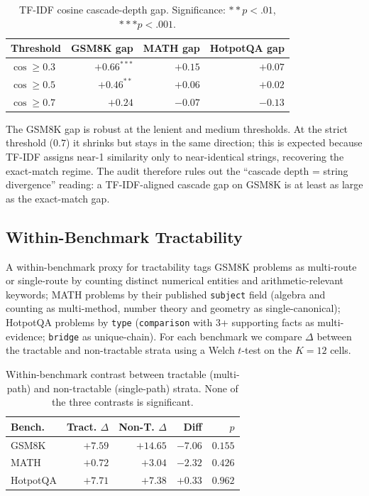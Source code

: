 \documentclass[11pt]{article}
\begin{document}
\begin{table}[t]
  \centering
  \small
  \begin{tabular}{@{}lrrr@{}}
    \toprule
    Threshold & GSM8K gap & MATH gap & HotpotQA gap \\
    \midrule
    $\cos \geq 0.3$ & $\mathbf{+0.66}^{***}$ & $+0.15$ & $+0.07$ \\
    $\cos \geq 0.5$ & $+0.46^{**}$ & $+0.06$ & $+0.02$ \\
    $\cos \geq 0.7$ & $+0.24$ & $-0.07$ & $-0.13$ \\
    \bottomrule
  \end{tabular}
  \caption{TF-IDF cosine cascade-depth gap. Significance: $**p<.01$, $***p<.001$.}
  \label{tab:tfidf}
\end{table}

The GSM8K gap is robust at the lenient and medium thresholds. At the strict threshold ($0.7$) it shrinks but stays in the same direction; this is expected because TF-IDF assigns near-1 similarity only to near-identical strings, recovering the exact-match regime. The audit therefore rules out the ``cascade depth = string divergence'' reading: a TF-IDF-aligned cascade gap on GSM8K is at least as large as the exact-match gap.

\subsection{Within-Benchmark Tractability}
\label{sec:within}

A within-benchmark proxy for tractability tags GSM8K problems as multi-route or single-route by counting distinct numerical entities and arithmetic-relevant keywords; MATH problems by their published \texttt{subject} field (algebra and counting as multi-method, number theory and geometry as single-canonical); HotpotQA problems by \texttt{type} (\texttt{comparison} with 3+ supporting facts as multi-evidence; \texttt{bridge} as unique-chain). For each benchmark we compare $\Delta$ between the tractable and non-tractable strata using a Welch $t$-test on the $K=12$ cells.

\begin{table}[t]
  \centering
  \small
  \begin{tabular}{@{}lrrrr@{}}
    \toprule
    Bench. & Tract. $\Delta$ & Non-T. $\Delta$ & Diff & $p$ \\
    \midrule
    GSM8K & $+7.59$ & $+14.65$ & $-7.06$ & $0.155$ \\
    MATH & $+0.72$ & $+3.04$ & $-2.32$ & $0.426$ \\
    HotpotQA & $+7.71$ & $+7.38$ & $+0.33$ & $0.962$ \\
    \bottomrule
  \end{tabular}
  \caption{Within-benchmark contrast between tractable (multi-path) and non-tractable (single-path) strata. None of the three contrasts is significant.}
  \label{tab:within}
\end{table}
\end{document}
